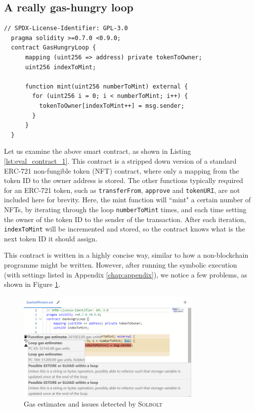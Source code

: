\subsection{A really gas-hungry loop}

\begin{lstlisting}[language=Solidity, caption={A really gas-hungry loop contract}, label={lst:eval_contract_1}, basicstyle=\ttfamily\scriptsize]
  // SPDX-License-Identifier: GPL-3.0
  pragma solidity >=0.7.0 <0.9.0;
  contract GasHungryLoop {
      mapping (uint256 => address) private tokenToOwner;
      uint256 indexToMint;

      function mint(uint256 numberToMint) external {
        for (uint256 i = 0; i < numberToMint; i++) {
          tokenToOwner[indexToMint++] = msg.sender;
        }
      }
  }
\end{lstlisting}

Let us examine the above smart contract, as shown in Listing \ref{lst:eval_contract_1}. 
This contract is a stripped down version of a standard ERC-721 non-fungible token (NFT) contract,
where only a mapping from the token ID to the owner address is stored. The other functions typically
required for an ERC-721 token, such as \texttt{transferFrom}, \texttt{approve} and \texttt{tokenURI}, 
are not included here for brevity. Here, the mint function will ``mint" a certain
number of NFTs, by iterating through the loop \texttt{numberToMint} times, and each time
setting the owner of the token ID to the sender of the transaction. After each iteration, \texttt{indexToMint}
will be incremented and stored, so the contract knows what is the next token ID it should assign.

This contract is written in a highly concise way, similar to how a non-blockchain programme
might be written. However, after running the symbolic execution (with settings listed in Appendix \ref{chap:appendix}), we notice a few problems,
as shown in Figure \ref{fig:eval_case_issues}.

\begin{figure}[h]
  \centering
  \includegraphics[width=0.8\textwidth]{./figures/eval/case_issues}
  \caption{Gas estimates and issues detected by \textcolor{NavyBlue}{\textsc{Solbolt}}}
  \label{fig:eval_case_issues}
\end{figure}

